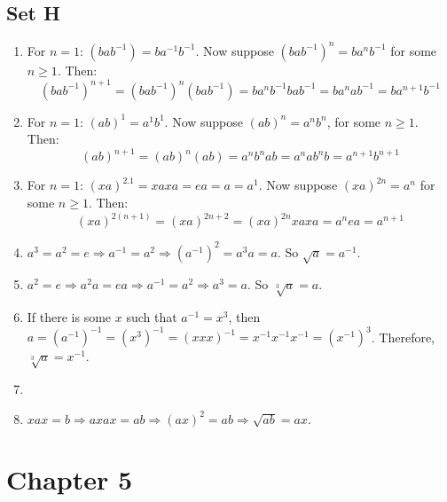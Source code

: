 \documentclass{article}
\begin{document}
\subsection{Set H}
\begin{enumerate}
    \item For $n = 1$: $(bab^{-1}) = ba^{-1}b^{-1}$. Now suppose $(bab^{-1})^{n} = ba^nb^{-1}$ for some $n \geqslant 1$. Then:
        $$(bab^{-1})^{n + 1} = (bab^{-1})^{n}(bab^{-1}) = ba^{n}b^{-1}bab^{-1} = ba^nab^{-1} = ba^{n + 1}b^{-1}$$
    \item For $n = 1$: $(ab)^1 = a^1b^1$. Now suppose $(ab)^n = a^nb^n$, for some $n \geqslant 1$. Then:
        $$(ab)^{n + 1} = (ab)^n(ab) = a^nb^nab = a^nab^nb = a^{n + 1}b^{n + 1}$$
    \item For $n = 1$: $(xa)^{2.1} = xaxa = ea = a = a^1$. Now suppose $(xa)^{2n} = a^n$ for some $n \geqslant 1$. Then:
        $$(xa)^{2(n + 1)} = (xa)^{2n + 2} = (xa)^{2n}xaxa = a^nea = a^{n + 1}$$
    \item $a^3 = a^2 = e \Rightarrow a^{-1} = a^2 \Rightarrow (a^{-1})^2 = a^3a = a$. So $\sqrt{a} = a^{-1}$.
    \item $a^2 = e \Rightarrow a^2a = ea \Rightarrow a^{-1} = a^2 \Rightarrow a^3 = a$. So $\sqrt[3]{a} = a$.
    \item If there is some $x$ such that $a^{-1} = x^3$, then $a = (a^{-1})^{-1} = (x^3)^{-1} = (xxx)^{-1} = x^{-1}x^{-1}x^{-1} = (x^{-1})^3$. Therefore, $\sqrt[3]{a} = x^{-1}$.
    \item 
    \item $xax = b \Rightarrow axax = ab \Rightarrow (ax)^2 = ab \Rightarrow \sqrt{ab} = ax$.
\end{enumerate}

\section{Chapter 5}
\end{document}
